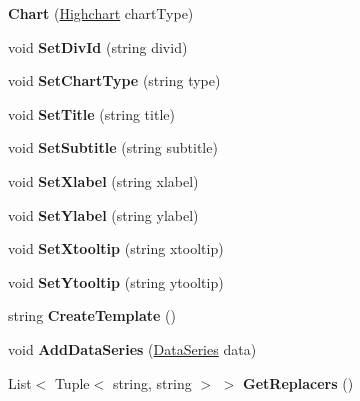 \begin{DoxyCompactItemize}
\item 
\mbox{\label{classHighcharts_1_1Chart_a625845e2b8c6f042ff83d9db852e3f92}} 
{\bfseries Chart} (\hyperlink{classHighcharts_1_1Highchart}{Highchart} chart\+Type)
\item 
\mbox{\label{classHighcharts_1_1Chart_a4fd34144f1927049fcfa878b7fed7415}} 
void {\bfseries Set\+Div\+Id} (string divid)
\item 
\mbox{\label{classHighcharts_1_1Chart_aafd35e8a8dfcb88c2c6bfb19aa8591a0}} 
void {\bfseries Set\+Chart\+Type} (string type)
\item 
\mbox{\label{classHighcharts_1_1Chart_a85d10a08b93b41e9696d777ec987f182}} 
void {\bfseries Set\+Title} (string title)
\item 
\mbox{\label{classHighcharts_1_1Chart_aba272ac5f497b412f19590ed216f21f1}} 
void {\bfseries Set\+Subtitle} (string subtitle)
\item 
\mbox{\label{classHighcharts_1_1Chart_a89a203b5d6bd81aec960ae3fb1fd4e17}} 
void {\bfseries Set\+Xlabel} (string xlabel)
\item 
\mbox{\label{classHighcharts_1_1Chart_ac009641d79c870f1b131faa30a740979}} 
void {\bfseries Set\+Ylabel} (string ylabel)
\item 
\mbox{\label{classHighcharts_1_1Chart_a596a28a795aa22d8e8bc42a83c549529}} 
void {\bfseries Set\+Xtooltip} (string xtooltip)
\item 
\mbox{\label{classHighcharts_1_1Chart_a13b3b073d6debd31afdc6c4fe29a4a47}} 
void {\bfseries Set\+Ytooltip} (string ytooltip)
\item 
\mbox{\label{classHighcharts_1_1Chart_a8de4430c7a4d26ca3ef2506c1ec4e9e9}} 
string {\bfseries Create\+Template} ()
\item 
\mbox{\label{classHighcharts_1_1Chart_ab740cbd7e41f8e63cb60d9b54357c654}} 
void {\bfseries Add\+Data\+Series} (\hyperlink{classHighcharts_1_1DataSeries}{Data\+Series} data)
\item 
\mbox{\label{classHighcharts_1_1Chart_a3d07ca3f01584223ab2ce140b8f14e5e}} 
List$<$ Tuple$<$ string, string $>$ $>$ {\bfseries Get\+Replacers} ()
\end{DoxyCompactItemize}
